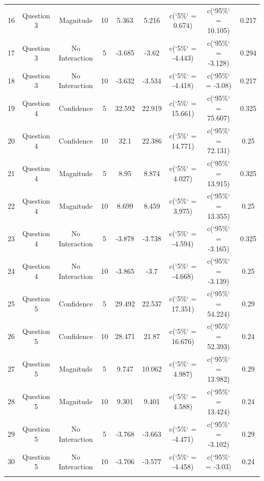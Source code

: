 \begin{table}[!htbp]
\begin{tabular}{@{\extracolsep{5pt}} ccccccccc}
16 & Question 3 & Magnitude & 10 & 5.363 & 5.216 & c(`5\%` = 0.674) & c(`95\%` = 10.105) & 0.217 \\ 
17 & Question 3 & No Interaction & 5 & -3.685 & -3.62 & c(`5\%` = -4.443) & c(`95\%` = -3.128) & 0.294 \\ 
18 & Question 3 & No Interaction & 10 & -3.632 & -3.534 & c(`5\%` = -4.418) & c(`95\%` = -3.08) & 0.217 \\ 
19 & Question 4 & Confidence & 5 & 32.592 & 22.919 & c(`5\%` = 15.661) & c(`95\%` = 75.607) & 0.325 \\ 
20 & Question 4 & Confidence & 10 & 32.1 & 22.386 & c(`5\%` = 14.771) & c(`95\%` = 72.131) & 0.25 \\ 
21 & Question 4 & Magnitude & 5 & 8.95 & 8.874 & c(`5\%` = 4.027) & c(`95\%` = 13.915) & 0.325 \\ 
22 & Question 4 & Magnitude & 10 & 8.699 & 8.459 & c(`5\%` = 3.975) & c(`95\%` = 13.355) & 0.25 \\ 
23 & Question 4 & No Interaction & 5 & -3.878 & -3.738 & c(`5\%` = -4.594) & c(`95\%` = -3.165) & 0.325 \\ 
24 & Question 4 & No Interaction & 10 & -3.865 & -3.7 & c(`5\%` = -4.668) & c(`95\%` = -3.139) & 0.25 \\ 
25 & Question 5 & Confidence & 5 & 29.492 & 22.537 & c(`5\%` = 17.351) & c(`95\%` = 54.224) & 0.29 \\ 
26 & Question 5 & Confidence & 10 & 28.471 & 21.87 & c(`5\%` = 16.676) & c(`95\%` = 52.393) & 0.24 \\ 
27 & Question 5 & Magnitude & 5 & 9.747 & 10.062 & c(`5\%` = 4.987) & c(`95\%` = 13.982) & 0.29 \\ 
28 & Question 5 & Magnitude & 10 & 9.301 & 9.401 & c(`5\%` = 4.588) & c(`95\%` = 13.424) & 0.24 \\ 
29 & Question 5 & No Interaction & 5 & -3.768 & -3.663 & c(`5\%` = -4.471) & c(`95\%` = -3.102) & 0.29 \\ 
30 & Question 5 & No Interaction & 10 & -3.706 & -3.577 & c(`5\%` = -4.458) & c(`95\%` = -3.03) & 0.24 \\ 
\hline \\[-1.8ex] 
\end{tabular} 
\end{table} 
